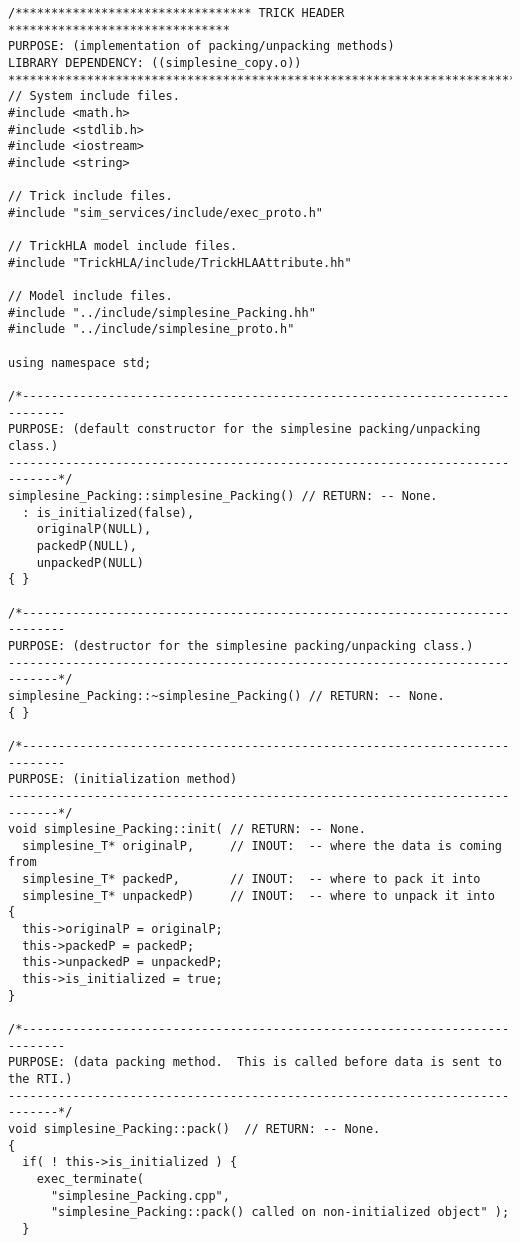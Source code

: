 \begin{lstlisting}[caption={{\tt simplesine\_Packing} class methods}]
/********************************* TRICK HEADER *******************************
PURPOSE: (implementation of packing/unpacking methods)
LIBRARY DEPENDENCY: ((simplesine_copy.o))
*******************************************************************************/
// System include files.
#include <math.h>
#include <stdlib.h>
#include <iostream>
#include <string>

// Trick include files.
#include "sim_services/include/exec_proto.h"

// TrickHLA model include files.
#include "TrickHLA/include/TrickHLAAttribute.hh"

// Model include files.
#include "../include/simplesine_Packing.hh"
#include "../include/simplesine_proto.h"

using namespace std;

/*----------------------------------------------------------------------------
PURPOSE: (default constructor for the simplesine packing/unpacking class.)
-----------------------------------------------------------------------------*/
simplesine_Packing::simplesine_Packing() // RETURN: -- None.
  : is_initialized(false),
    originalP(NULL),
    packedP(NULL),
    unpackedP(NULL)
{ }

/*----------------------------------------------------------------------------
PURPOSE: (destructor for the simplesine packing/unpacking class.)
-----------------------------------------------------------------------------*/
simplesine_Packing::~simplesine_Packing() // RETURN: -- None.
{ }

/*----------------------------------------------------------------------------
PURPOSE: (initialization method)
-----------------------------------------------------------------------------*/
void simplesine_Packing::init( // RETURN: -- None.
  simplesine_T* originalP,     // INOUT:  -- where the data is coming from
  simplesine_T* packedP,       // INOUT:  -- where to pack it into
  simplesine_T* unpackedP)     // INOUT:  -- where to unpack it into
{
  this->originalP = originalP;
  this->packedP = packedP;
  this->unpackedP = unpackedP;
  this->is_initialized = true;
}

/*----------------------------------------------------------------------------
PURPOSE: (data packing method.  This is called before data is sent to the RTI.)
-----------------------------------------------------------------------------*/
void simplesine_Packing::pack()  // RETURN: -- None.
{
  if( ! this->is_initialized ) {
    exec_terminate(
      "simplesine_Packing.cpp",
      "simplesine_Packing::pack() called on non-initialized object" );
  }


\end{lstlisting}
